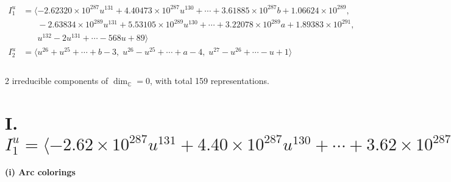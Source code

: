 \documentclass[1p]{elsarticle_modified}
\theoremstyle{definition}
\begin{document}
\begin{align*}
I^u_{1}&=\langle 
-2.62320\times10^{287} u^{131}+4.40473\times10^{287} u^{130}+\cdots+3.61885\times10^{287} b+1.06624\times10^{289},\\
\phantom{I^u_{1}}&\phantom{= \langle  }-2.63834\times10^{289} u^{131}+5.53105\times10^{289} u^{130}+\cdots+3.22078\times10^{289} a+1.89383\times10^{291},\\
\phantom{I^u_{1}}&\phantom{= \langle  }u^{132}-2 u^{131}+\cdots-568 u+89\rangle \\
I^u_{2}&=\langle 
u^{26}+u^{25}+\cdots+b-3,\;u^{26}- u^{25}+\cdots+a-4,\;u^{27}- u^{26}+\cdots- u+1\rangle \\
\\
\end{align*}
\raggedright * 2 irreducible components of $\dim_{\mathbb{C}}=0$, with total 159 representations.\\
\newpage
\renewcommand{\arraystretch}{1}
\centering \section*{I. $I^u_{1}= \langle -2.62\times10^{287} u^{131}+4.40\times10^{287} u^{130}+\cdots+3.62\times10^{287} b+1.07\times10^{289},\;-2.64\times10^{289} u^{131}+5.53\times10^{289} u^{130}+\cdots+3.22\times10^{289} a+1.89\times10^{291},\;u^{132}-2 u^{131}+\cdots-568 u+89 \rangle$}
\flushleft \textbf{(i) Arc colorings}\\
\end{document}
